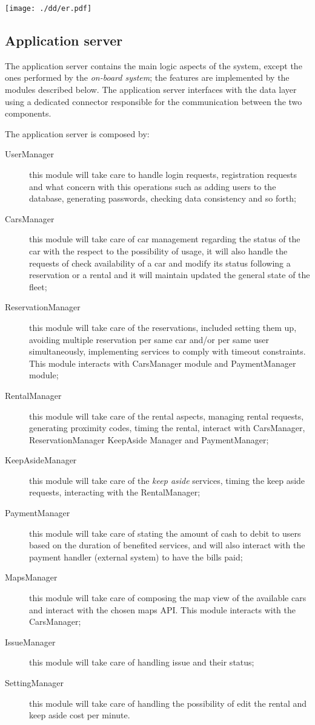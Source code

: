 \documentclass{scrreprt}
\begin{document}
\begin{center}
		\texttt{[image: ./dd/er.pdf]}
\end{center}

\subsection{Application server}
The application server contains the main logic aspects of the system, except the ones performed by the \emph{on-board system}; the features are implemented by the modules described below.
The application server interfaces with the data layer using a dedicated connector responsible for the communication between the two components. 

The application server is composed by:
\begin{description}
\item[UserManager] this module will take care to handle login requests, registration requests and what concern with this operations such as adding users to the database, generating passwords, checking data consistency and so forth;
\item[CarsManager] this module will take care of car management regarding the status of the car with the respect to the possibility of usage, it will also handle the requests of check availability of a car and modify its status following a reservation or a rental and it will maintain updated the general state of the fleet;
\item[ReservationManager] this module will take care of the reservations, included setting them up, avoiding multiple reservation per same car and/or per same user simultaneously, implementing services to comply with timeout constraints. This module interacts with CarsManager module and PaymentManager module;
\item[RentalManager] this module will take care of the rental aspects, managing rental requests, generating proximity codes, timing the rental, interact with CarsManager, ReservationManager KeepAside Manager and PaymentManager;
\item[KeepAsideManager] this module will take care of the \emph{keep aside} services, timing the keep aside requests, interacting with the RentalManager;
\item[PaymentManager] this module will take care of stating the amount of cash to debit to users based on the duration of benefited services, and will also interact with the payment handler (external system) to have the bills paid;
\item[MapsManager] this module will take care of composing the map view of the available cars and interact with the chosen maps API. This module interacts with the CarsManager;
\item[IssueManager] this module will take care of handling issue and their status;
\item[SettingManager] this module will take care of handling the possibility of edit the rental and keep aside cost per minute.
\end{description}
\end{document}
